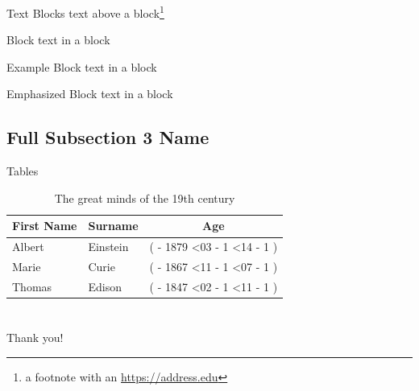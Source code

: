 \documentclass[
  aspectratio=169,
]{beamer}
\begin{document}
\begin{frame}{Text Blocks}
text above a block\footnote{a footnote with an \url{https://address.edu}}
\begin{block}{Block}
  text in a block
\end{block}
\begin{exampleblock}{Example Block}
  text in a block
\end{exampleblock}
\begin{alertblock}{Emphasized Block}
  text in a block
\end{alertblock}
\end{frame}


\subsection[Short Subsection 3 Name]{Full Subsection 3 Name}

\def\age(#1-#2-#3){%
  \the\numexpr(
    \year - #1
    \ifnum\month<#2
      - 1
    \else
      \ifnum\month=#2
        \ifnum\day<#3
          - 1
        \fi
      \fi
    \fi
  )%
}

\begin{frame}{Tables}
\begin{table}
  \begin{tabular}{llc}
    First Name & Surname & Age \\ \midrule
    Albert & Einstein & \age(1879-03-14) \\
    Marie & Curie & \age(1867-11-07) \\
    Thomas & Edison & \age(1847-02-11) \\
  \end{tabular}
  \caption{The great minds of the 19th century}
\end{table}
\end{frame}

\section{\bibname}
\begin{frame}[t, allowframebreaks]{\bibname}
\printbibliography[heading=none]
\end{frame}

\begin{frame}[plain]
\vfill
\centerline{Thank you!}
\vfill\vfill
\end{frame}

\end{document}
